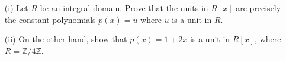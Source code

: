 \documentclass[12pt,letterpaper]{hmcpset}
\newcommand{\Zz}{\mathbb{Z}}
\begin{document}
\begin{problem}[{\bf Problem A}]
	\begin{enumerate}
		\item[(i)]
		Let $R$ be an integral domain. Prove that the units in $R[x]$ are precisely the constant polynomials $p(x) = u$ where $u$ is a unit in $R$.
		\item[(ii)]
		On the other hand, show that $p(x) = 1+2x$ is a unit in $R[x]$, where $R = \Zz/4\Zz$.
	\end{enumerate}
\end{problem}
\begin{solution}
	\vfill
\end{solution}
\end{document}
